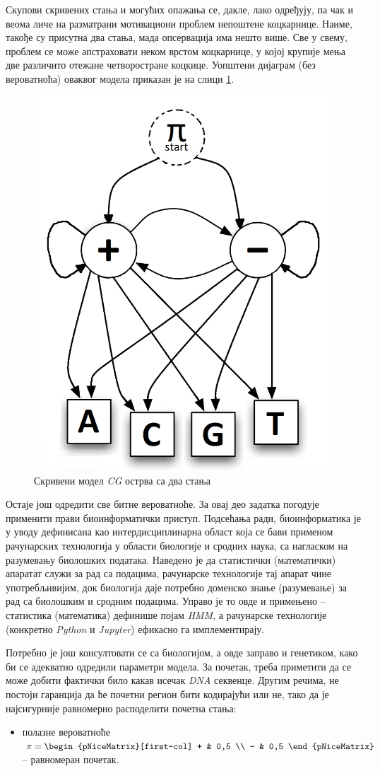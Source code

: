 \documentclass[12pt,oneside]{memoir}
\begin{document}
\begin{CJK}{UTF8}{ipxm}
Скупови скривених стања и могућих опажања се, дакле, лако одређују, па чак и веома личе на разматрани мотивациони проблем непоштене коцкарнице. Наиме, такође су присутна два стања, мада опсервација има нешто више. Све у свему, проблем се може апстраховати неком врстом коцкарнице, у којој крупије мења две различито отежане четворостране коцкице. Уопштени дијаграм (без вероватноћа) оваквог модела приказан је на слици \ref{fig:cg_graf}.

\begin{figure}[!ht]
  \centering
  \includegraphics[width=.5\textwidth]{cg_graf.png}
  \caption{Скривени модел \textit{CG} острва са два стања}
  \label{fig:cg_graf}
\end{figure}

Остаје још одредити све битне вероватноће. За овај део задатка погодује применити прави биоинформатички приступ. Подсећања ради, биоинформатика је у уводу дефинисана као интердисциплинарна област која се бави применом рачунарских технологија у области биологије и сродних наука, са нагласком на разумевању биолошких података. Наведено је да статистички (математички) апаратат служи за рад са подацима, рачунарске технологије тај апарат чине употребљивијим, док биологија даје потребно доменско знање (разумевање) за рад са биолошким и сродним подацима. Управо је то овде и примењено -- статистика (математика) дефинише појам \textit{HMM}, а рачунарске технологије (конкретно \textit{Python} и \textit{Jupyter}) ефикасно га имплементирају.

Потребно је још консултовати се са биологијом, а овде заправо и генетиком, како би се адекватно одредили параметри модела. За почетак, треба приметити да се може добити фактички било какав исечак \textit{DNA} секвенце. Другим речима, не постоји гаранција да ће почетни регион бити кодирајући или не, тако да је најсигурније равномерно расподелити почетна стања:
\begin{itemize}
  \item полазне вероватноће $\pi = \begin{pNiceMatrix}[first-col] + & 0,5 \\ - & 0,5 \end{pNiceMatrix}$ -- равномеран почетак.
\end{itemize}


\end{CJK}
\end{document}
